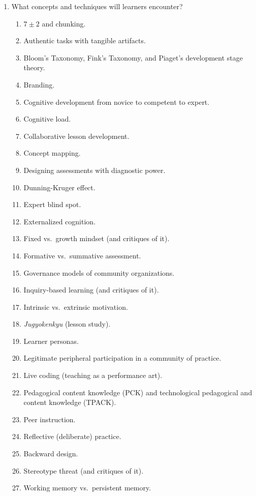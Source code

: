\begin{enumerate}
\item
  What concepts and techniques will learners encounter?
  \begin{enumerate}
  \item
    $7{\pm}2$ and chunking.
  \item
    Authentic tasks with tangible artifacts.
  \item
    Bloom's Taxonomy, Fink's Taxonomy, and Piaget's development stage theory.
  \item
    Branding.
  \item
    Cognitive development from novice to competent to expert.
  \item
    Cognitive load.
  \item
    Collaborative lesson development.
  \item
    Concept mapping.
  \item
    Designing assessments with diagnostic power.
  \item
    Dunning-Kruger effect.
  \item
    Expert blind spot.
  \item
    Externalized cognition.
  \item
    Fixed vs.\ growth mindset (and critiques of it).
  \item
    Formative vs.\ summative assessment.
  \item
    Governance models of community organizations.
  \item
    Inquiry-based learning (and critiques of it).
  \item
    Intrinsic vs.\ extrinsic motivation.
  \item
    \emph{Jugyokenkyu} (lesson study).
  \item
    Learner personas.
  \item
    Legitimate peripheral participation in a community of practice.
  \item
    Live coding (teaching as a performance art).
  \item
    Pedagogical content knowledge (PCK) and technological pedagogical
    and content knowledge (TPACK).
  \item
    Peer instruction.
  \item
    Reflective (deliberate) practice.
  \item
    Backward design.
  \item
    Stereotype threat (and critiques of it).
  \item
    Working memory vs.\ persistent memory.
  \end{enumerate}


\end{enumerate}
